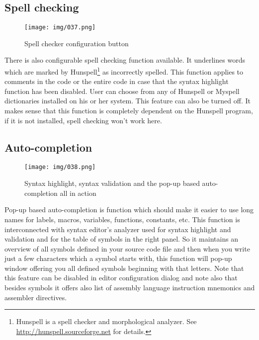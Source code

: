 \documentclass[a4paper,twoside,12pt]{book}
\begin{document}
		\subsection{Spell checking}
			\begin{wrapfigure}{l}{100pt}
				\centering{}
				\texttt{[image: img/037.png]}
				\caption{Spell checker configuration button}
			\end{wrapfigure}
			There is also configurable spell checking function available. It underlines words which are marked by Hunspell\footnote{Hunspell is a spell checker and morphological analyzer. See \url{http://hunspell.sourceforge.net} for details.} as incorrectly spelled. This function applies to comments in the code or the entire code in case that the syntax highlight function has been disabled. User can choose from any of Hunspell or Myspell dictionaries installed on his or her system. This feature can also be turned off. It makes sense that this function is completely dependent on the Hunspell program, if it is not installed, spell checking won't work here.
		\subsection{Auto-completion}
			\begin{wrapfigure}{r}{180pt}
				\centering{}
				\texttt{[image: img/038.png]}
				\caption{Syntax highlight, syntax validation and the pop-up based auto-completion all in action}
			\end{wrapfigure}
			Pop-up based auto-completion is function which should make it easier to use long names for labels, macros, variables, functions, constants, etc. This function is interconnected with syntax editor's analyzer used for syntax highlight and validation and for the table of symbols in the right panel. So it maintains an overview of all symbols defined in your source code file and then when you write just a few characters which a symbol starts with, this function will pop-up window offering you all defined symbols beginning with that letters. Note that this feature can be disabled in editor configuration dialog and note also that besides symbols it offers also list of assembly language instruction mnemonics and assembler directives.
\end{document}
